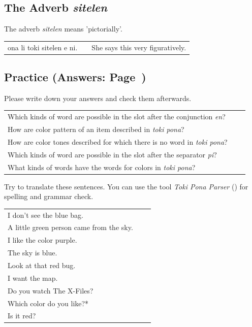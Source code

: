%
\subsection*{The Adverb \textit{sitelen}}
%
%
The adverb \textit{sitelen} means 'pictorially'. 

\begin{supertabular}{p{5,5cm}|ll}
ona li toki sitelen e ni. && She says this very figuratively. \\
\end{supertabular}

%
\newpage
%
\subsection*{Practice (Answers: Page~\pageref{'colors'})}
%
Please write down your answers and check them afterwards. 

\begin{supertabular}{p{5,5cm}|ll}
Which kinds of word are possible in the slot after the conjunction \textit{en}? &&  \\ %
How are color pattern of an item described in \textit{toki pona}? &&  \\ %
How are color tones described for which there is no word in \textit{toki pona}? &&  \\ %
Which kinds of word are possible in the slot after the separator \textit{pi}? &&   \\ %
What kinds of words have the words for colors in \textit{toki pona}? &&  \\ %
\end{supertabular} 

Try to translate these sentences. 
You can use the tool \textit{Toki Pona Parser} (\cite{www:rowa:02}) for spelling and grammar check. 

\begin{supertabular}{p{5,5cm}|ll}
I don't see the blue bag. &&   \\ %
A little green person came from the sky. &&   \\ %
I like the color purple.  &&  \\ %
The sky is blue. &&   \\ %
Look at that red bug.  &&  \\ %
I want the map.  &&  \\ %
Do you watch The X-Files? &&  \\  %
Which color do you like?* &&  \\  %
Is it red? &&   \\ %
\end{supertabular}

